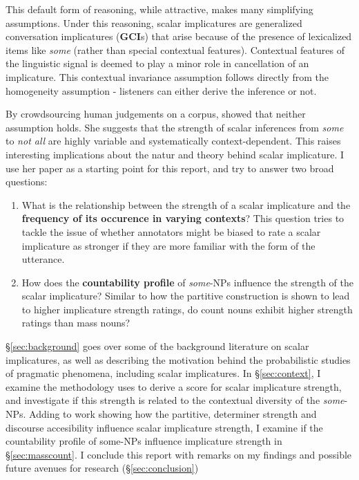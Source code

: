 \documentclass[10pt, biblatex]{report}
\begin{document}
This default form of reasoning, while attractive, makes many simplifying
assumptions. Under this reasoning, scalar implicatures are generalized
conversation implicatures (\textbf{GCI}s) that arise because of the presence of
lexicalized items like \textit{some} (rather than special contextual features).
Contextual features of the linguistic signal is
deemed to play a minor role in cancellation of an implicature. This {\rmsc
contextual invariance} assumption follows directly from the {\rmsc homogeneity}
assumption - listeners can either derive the inference or not.


By crowdsourcing human judgements on a corpus, \citet{degen_investigating_2015}
showed that neither assumption holds. She
suggests that the strength of scalar inferences from \textit{some} to
\textit{not all} are highly variable and systematically context-dependent. This
raises interesting implications about the natur and theory behind scalar
implicature. I use her paper as a starting point for this report, and try to
answer two broad questions:

\begin{enumerate}
    \item What is the relationship between the strength of a scalar implicature
          and the \textbf{frequency of its occurence in varying contexts}? This question
          tries to tackle the issue of whether annotators might be biased to
          rate a scalar implicature as stronger if they are more familiar with
          the form of the utterance.
    \item How does the \textbf{countability profile} of \textit{some}-NPs influence
          the strength of the scalar implicature? Similar to how the partitive
          construction is shown to lead to higher implicature strength ratings,
          do count nouns exhibit higher strength ratings than mass nouns?
\end{enumerate}

\S\ref{sec:background} goes over some of the background literature on scalar
implicatures, as well as describing the motivation behind the probabilistic
studies of pragmatic phenomena, including scalar implicatures. In \S\ref{sec:context},
I examine the methodology \citeauthor{degen_investigating_2015} uses to derive
a score for scalar implicature strength, and investigate if this strength is
related to the contextual diversity of the \textit{some}-NPs. Adding to
 work showing
how the partitive, determiner strength and discourse accesibility influence
scalar implicature strength, I examine if the countability profile of some-NPs
influence implicature strength in \S\ref{sec:masscount}. I conclude this report
with remarks on my findings and possible future avenues for research
(\S\ref{sec:conclusion})
\end{document}
